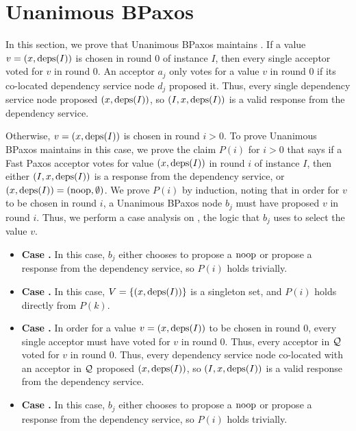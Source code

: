 \section{Unanimous BPaxos}
In this section, we prove that Unanimous BPaxos maintains
.
%
If a value $v = (x, \text{deps}(I))$ is chosen in round $0$ of instance $I$, then
every single acceptor voted for $v$ in round $0$. An acceptor $a_j$ only votes
for a value $v$ in round $0$ if its co-located dependency service node $d_j$
proposed it. Thus, every single dependency service node proposed $(x,
\text{deps}(I))$, so $(I, x, \text{deps}(I))$ is a valid response from the dependency
service.

Otherwise, $v = (x, \text{deps}(I))$ is chosen in round $i > 0$. To prove Unanimous
BPaxos maintains  in this case, we prove the
claim $P(i)$ for $i > 0$ that says if a Fast Paxos acceptor votes for value
$(x, \text{deps}(I))$ in round $i$ of instance $I$, then either
  $(I, x, \text{deps}(I))$ is a response from the dependency service, or
  $(x, \text{deps}(I)) = (\text{noop}, \emptyset)$.
We prove $P(i)$ by induction, noting that in order for $v$ to be chosen in
round $i$, a Unanimous BPaxos node $b_j$ must have proposed $v$ in round $i$.
Thus, we perform a case analysis on , the logic that
$b_j$ uses to select the value $v$.
\begin{itemize}
  \item \textbf{Case .}
    In this case, $b_j$ either chooses to propose a $\text{noop}$ or propose a
    response from the dependency service, so $P(i)$ holds trivially.

  \item \textbf{Case .}
    In this case, $V = \{(x, \text{deps}(I))\}$ is a singleton set, and $P(i)$
    holds directly from $P(k)$.

  \item \textbf{Case .}
    In order for a value $v = (x, \text{deps}(I))$ to be chosen in round $0$, every
    single acceptor must have voted for $v$ in round $0$. Thus, every acceptor
    in $\mathcal{Q}$ voted for $v$ in round $0$. Thus, every dependency service
    node co-located with an acceptor in $\mathcal{Q}$ proposed $(x, \text{deps}(I))$, so
    $(I, x, \text{deps}(I))$ is a valid response from the dependency service.

  \item \textbf{Case .}
    In this case, $b_j$ either chooses to propose a $\text{noop}$ or propose a
    response from the dependency service, so $P(i)$ holds trivially.
\end{itemize}
